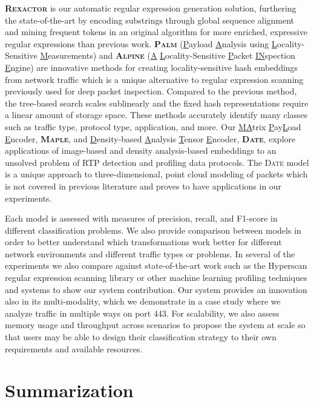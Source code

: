 \textbf{\textsc{Rexactor}} is our automatic regular expression generation solution, furthering the state-of-the-art by encoding substrings through global sequence alignment and mining frequent tokens in an original algorithm for more enriched, expressive regular expressions than previous work. \textbf{\textsc{Palm}} (\underline{P}ayload \underline{A}nalysis using \underline{L}ocality-Sensitive \underline{M}easurements) and \textbf{\textsc{Alpine}} (\underline{A} \underline{L}ocality-Sensitive \underline{P}acket \underline{IN}spection \underline{E}ngine) are innovative methods for creating locality-sensitive hash embeddings from network traffic which is a unique alternative to regular expression scanning previously used for deep packet inspection. Compared to the previous method, the tree-based search scales sublinearly and the fixed hash representations require a linear amount of storage space. These methods accurately identify many classes such as traffic type, protocol type, application, and more. Our \underline{MA}trix \underline{P}ay\underline{L}oad \underline{E}ncoder, \textbf{\textsc{Maple}}, and \underline{D}ensity-based \underline{A}nalysis \underline{T}ensor \underline{E}ncoder, \textbf{\textsc{Date}}, explore applications of image-based and density analysis-based embeddings to an unsolved problem of RTP detection and profiling data protocols. The \textsc{Date} model is a unique approach to three-dimensional, point cloud modeling of packets which is not covered in previous literature and proves to have applications in our experiments.

Each model is assessed with measures of precision, recall, and F1-score in different classification problems. We also provide comparison between models in order to better understand which transformations work better for different network environments and different traffic types or problems. In several of the experiments we also compare against state-of-the-art work such as the Hyperscan regular expression scanning library or other machine learning profiling techniques and systems to show our system contribution. Our system provides an innovation also in its multi-modality, which we demonstrate in a case study where we analyze traffic in multiple ways on port 443. For scalability, we also assess memory usage and throughput across scenarios to propose the system at scale so that users may be able to design their classification strategy to their own requirements and available resources.

\section{Summarization}

